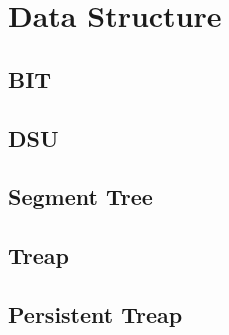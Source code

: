 \documentclass[a4paper,10pt,twocolumn,oneside,x11names]{article}
\begin{document}
%

%

\section{Data Structure}

\subsection{BIT}


\subsection{DSU}


\subsection{Segment Tree}


%

\subsection{Treap}


\subsection{Persistent Treap}

\end{document}
